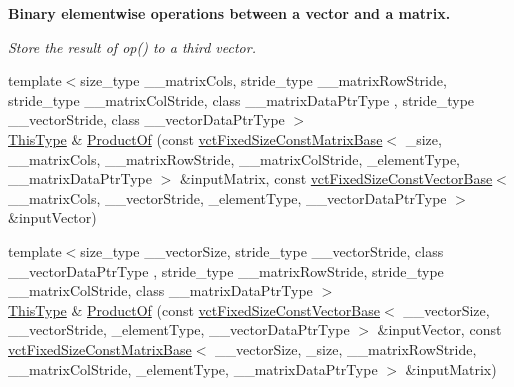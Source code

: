 \begin{Indent}{\bf Binary elementwise operations between a vector and a matrix.}\par
{\em Store the result of op() to a third vector. }\begin{DoxyCompactItemize}
\item 
{\footnotesize template$<$size\+\_\+type \+\_\+\+\_\+matrix\+Cols, stride\+\_\+type \+\_\+\+\_\+matrix\+Row\+Stride, stride\+\_\+type \+\_\+\+\_\+matrix\+Col\+Stride, class \+\_\+\+\_\+matrix\+Data\+Ptr\+Type , stride\+\_\+type \+\_\+\+\_\+vector\+Stride, class \+\_\+\+\_\+vector\+Data\+Ptr\+Type $>$ }\\\hyperlink{classvct_fixed_size_const_vector_base_a071063bc4fa43112cc287b2dbef53180}{This\+Type} \& \hyperlink{classvct_fixed_size_vector_base_ad9749268a988b7cf806d2d0933bbaa19}{Product\+Of} (const \hyperlink{classvct_fixed_size_const_matrix_base}{vct\+Fixed\+Size\+Const\+Matrix\+Base}$<$ \+\_\+size, \+\_\+\+\_\+matrix\+Cols, \+\_\+\+\_\+matrix\+Row\+Stride, \+\_\+\+\_\+matrix\+Col\+Stride, \+\_\+element\+Type, \+\_\+\+\_\+matrix\+Data\+Ptr\+Type $>$ \&input\+Matrix, const \hyperlink{classvct_fixed_size_const_vector_base}{vct\+Fixed\+Size\+Const\+Vector\+Base}$<$ \+\_\+\+\_\+matrix\+Cols, \+\_\+\+\_\+vector\+Stride, \+\_\+element\+Type, \+\_\+\+\_\+vector\+Data\+Ptr\+Type $>$ \&input\+Vector)
\item 
{\footnotesize template$<$size\+\_\+type \+\_\+\+\_\+vector\+Size, stride\+\_\+type \+\_\+\+\_\+vector\+Stride, class \+\_\+\+\_\+vector\+Data\+Ptr\+Type , stride\+\_\+type \+\_\+\+\_\+matrix\+Row\+Stride, stride\+\_\+type \+\_\+\+\_\+matrix\+Col\+Stride, class \+\_\+\+\_\+matrix\+Data\+Ptr\+Type $>$ }\\\hyperlink{classvct_fixed_size_const_vector_base_a071063bc4fa43112cc287b2dbef53180}{This\+Type} \& \hyperlink{classvct_fixed_size_vector_base_a89845acf29f13d22068a1e4fbd77bf40}{Product\+Of} (const \hyperlink{classvct_fixed_size_const_vector_base}{vct\+Fixed\+Size\+Const\+Vector\+Base}$<$ \+\_\+\+\_\+vector\+Size, \+\_\+\+\_\+vector\+Stride, \+\_\+element\+Type, \+\_\+\+\_\+vector\+Data\+Ptr\+Type $>$ \&input\+Vector, const \hyperlink{classvct_fixed_size_const_matrix_base}{vct\+Fixed\+Size\+Const\+Matrix\+Base}$<$ \+\_\+\+\_\+vector\+Size, \+\_\+size, \+\_\+\+\_\+matrix\+Row\+Stride, \+\_\+\+\_\+matrix\+Col\+Stride, \+\_\+element\+Type, \+\_\+\+\_\+matrix\+Data\+Ptr\+Type $>$ \&input\+Matrix)
\end{DoxyCompactItemize}
\end{Indent}
